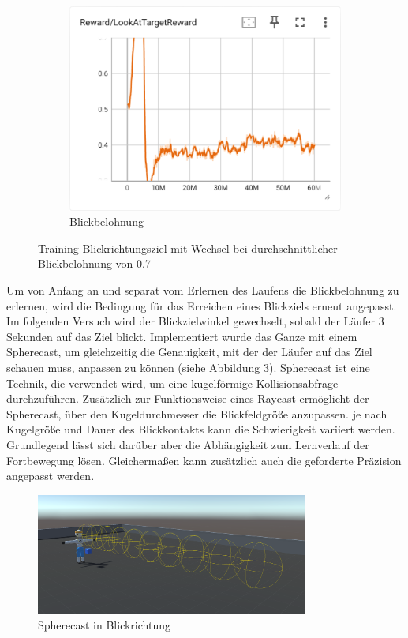 \begin{figure}[H]
\begin{subfigure}{.49\textwidth}
      \centering  
      \includegraphics[width=\textwidth]{img/113_look_reward}
      \caption{Blickbelohnung}
      \label{fig:113_look_reward}
    \end{subfigure}
  \caption{Training Blickrichtungsziel mit Wechsel bei durchschnittlicher Blickbelohnung von 0.7}
  \label{fig:training_blickrichtungsziel_wechsel_07}
\end{figure}

Um von Anfang an und separat vom Erlernen des Laufens die Blickbelohnung zu erlernen, wird die Bedingung für das Erreichen eines Blickziels erneut angepasst. Im folgenden Versuch wird der Blickzielwinkel gewechselt, sobald der Läufer 3 Sekunden auf das Ziel blickt. Implementiert wurde das Ganze mit einem Spherecast, um gleichzeitig die Genauigkeit, mit der der Läufer auf das Ziel schauen muss, anpassen zu können (siehe Abbildung \ref{fig:spherecast}). Spherecast ist eine Technik, die verwendet wird, um eine kugelförmige Kollisionsabfrage durchzuführen. Zusätzlich zur Funktionsweise eines Raycast ermöglicht der Spherecast, über den Kugeldurchmesser die Blickfeldgröße anzupassen. je nach Kugelgröße und Dauer des Blickkontakts kann die Schwierigkeit variiert werden. Grundlegend lässt sich darüber aber die Abhängigkeit zum Lernverlauf der Fortbewegung lösen. Gleichermaßen kann zusätzlich auch die geforderte Präzision angepasst werden.

\begin{figure}[H]
  \centering  
  \includegraphics[width=0.8\textwidth]{img/spherecast}
  \caption{Spherecast in Blickrichtung}
  \label{fig:spherecast}
\end{figure}


